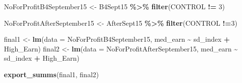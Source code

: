 \documentclass[
]{article}
\newenvironment{Shaded}{\begin{snugshade}}{\end{snugshade}}
\newcommand{\DataTypeTok}[1]{\textcolor[rgb]{0.13,0.29,0.53}{#1}}
\newcommand{\DecValTok}[1]{\textcolor[rgb]{0.00,0.00,0.81}{#1}}
\newcommand{\KeywordTok}[1]{\textcolor[rgb]{0.13,0.29,0.53}{\textbf{#1}}}
\newcommand{\NormalTok}[1]{#1}
\newcommand{\OperatorTok}[1]{\textcolor[rgb]{0.81,0.36,0.00}{\textbf{#1}}}
\newcommand{\StringTok}[1]{\textcolor[rgb]{0.31,0.60,0.02}{#1}}
\begin{document}
\begin{Shaded}
\begin{Highlighting}[]
\NormalTok{NoForProfitB4September15 \textless{}{-}}\StringTok{ }\NormalTok{B4Sept15 }\OperatorTok{\%\textgreater{}\%}
\StringTok{  }\KeywordTok{filter}\NormalTok{(CONTROL }\OperatorTok{!=}\StringTok{ }\DecValTok{3}\NormalTok{)}

\NormalTok{NoForProfitAfterSeptember15 \textless{}{-}}\StringTok{ }\NormalTok{AfterSept15 }\OperatorTok{\%\textgreater{}\%}
\StringTok{  }\KeywordTok{filter}\NormalTok{(CONTROL }\OperatorTok{!=}\DecValTok{3}\NormalTok{)}

\NormalTok{final1 \textless{}{-}}\StringTok{ }\KeywordTok{lm}\NormalTok{(}\DataTypeTok{data =}\NormalTok{ NoForProfitB4September15, med\_earn }\OperatorTok{\textasciitilde{}}\StringTok{ }\NormalTok{sd\_index }\OperatorTok{+}\StringTok{ }\NormalTok{High\_Earn)}
\NormalTok{final2 \textless{}{-}}\StringTok{ }\KeywordTok{lm}\NormalTok{(}\DataTypeTok{data =}\NormalTok{ NoForProfitAfterSeptember15, med\_earn }\OperatorTok{\textasciitilde{}}\StringTok{ }\NormalTok{sd\_index }\OperatorTok{+}\StringTok{ }\NormalTok{High\_Earn)}

\KeywordTok{export\_summs}\NormalTok{(final1, final2)}
\end{Highlighting}
\end{Shaded}

 
  \providecommand{\huxb}[2]{\arrayrulecolor[RGB]{#1}\global\arrayrulewidth=#2pt}
  \providecommand{\huxvb}[2]{\color[RGB]{#1}\vrule width #2pt}
  \providecommand{\huxtpad}[1]{\rule{0pt}{#1}}
  \providecommand{\huxbpad}[1]{\rule[-#1]{0pt}{#1}}
\end{document}
